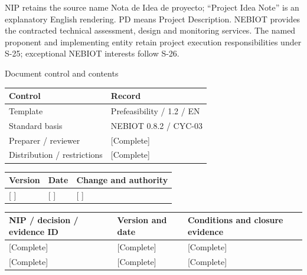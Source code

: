 \vspace{2mm}
NIP retains the source name Nota de Idea de proyecto; “Project Idea Note” is an explanatory English rendering. PD means Project Description.
\vspace{2mm}
NEBIOT provides the contracted technical assessment, design and monitoring services. The named proponent and implementing entity retain project execution responsibilities under S-25; exceptional NEBIOT interests follow S-26.
\clearpage
{\fontsize{23}{27}\selectfont\color{NEBGreen}Document control and contents\par}
\vspace{3mm}
{\sffamily\fontsize{8.3}{10.3}\selectfont\begin{longtable}{@{}P{50.55mm} P{117.94mm}@{}}
\toprule
\textbf{Control} & \textbf{Record}\\\midrule\endhead
\rule{0pt}{7.7mm}Template & Prefeasibility / 1.2 / EN\\\hline
\rule{0pt}{7.7mm}Standard basis & NEBIOT 0.8.2 / CYC-03\\\hline
\rule{0pt}{7.7mm}Preparer / reviewer & [Complete]\\\hline
\rule{0pt}{7.7mm}Distribution / restrictions & [Complete]\\\hline
\end{longtable}}
{\sffamily\fontsize{8.3}{10.3}\selectfont\begin{longtable}{@{}P{31.34mm} P{37.94mm} P{95.68mm}@{}}
\toprule
\textbf{Version} & \textbf{Date} & \textbf{Change and authority}\\\midrule\endhead
\rule{0pt}{7.7mm}[ ] & [ ] & [ ]\\\hline
\end{longtable}}
{\sffamily\fontsize{9.5}{11.4}\selectfont\tableofcontents}
{\sffamily\fontsize{8.3}{10.3}\selectfont\begin{longtable}{@{}P{57.74mm} P{36.29mm} P{70.94mm}@{}}
\toprule
\textbf{NIP / decision / evidence ID} & \textbf{Version and date} & \textbf{Conditions and closure evidence}\\\midrule\endhead
\rule{0pt}{7.7mm}[Complete] & [Complete] & [Complete]\\\hline
\rule{0pt}{7.7mm}[Complete] & [Complete] & [Complete]\\\hline
\end{longtable}}
